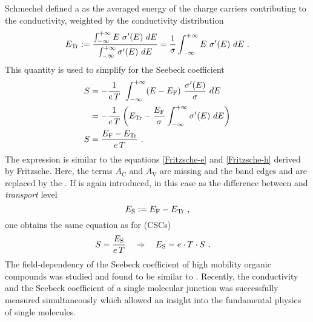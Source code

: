Schmechel defined a \EtLong \Et as the averaged energy of the charge carriers contributing to the conductivity, weighted by the conductivity distribution
\begin{equation}
\Et :=  \frac
{ \int_{-\infty} ^{+\infty} E ~ \c'(E) ~ dE }
{ \int_{-\infty} ^{+\infty} \c'(E) ~ dE } 
= \frac{1}{\c} \int_{-\infty} ^{+\infty} E ~ \c'(E) ~ dE
\label{eq:DefEt}
\PUNKT
\end{equation}
This quantity is used to simplify  for the Seebeck coefficient
\begin{align}
\S &= - \frac{1}{e\,T} ~ \int_{-\infty} ^{+\infty} (E-\Ef) ~ \frac{\c'(E)}{\c} ~ dE
\nonumber
 \\
 &= - \frac{1}{e\,T} \left(\Et - \frac{\Ef}{\c} \int_{-\infty} ^{+\infty} \c'(E)  ~ dE \right)\\
\S &=\frac{\Ef-\Et}{e\,T} \label{eq:Schmechel-S}
\PUNKT
\end{align}
The expression \lasteq is similar to the equations \eqref{Fritzsche-e} and \eqref{Fritzsche-h} derived by Fritzsche. Here, the terms $A_\text{C}$ and $A_\text{V}$ are missing and the band edges \Ec and \Ev are replaced by the \EtLong \Et. If \Es is again introduced, in this case as the difference between \EfLong and \emph{transport} level %
\begin{equation}
\Es := \Ef - \Et\label{eq:Es=Ef-Et}
\KOMMA
\end{equation}
one obtains the same equation as for \CSCs (CSCs)%
\begin{align}
\S &=\frac{\Es}{e\,T} \quad \Rightarrow \quad \Es = e \cdot T \cdot S
\label{eq:S-Es-org}
\PUNKT
\end{align}
The field-dependency of the Seebeck coefficient of high mobility organic compounds was studied and found to be similar to \CSCs\cite{Pernstich2008}.
Recently, the conductivity and the Seebeck coefficient of a single molecular junction was successfully measured simultaneously\cite{Widawsky2012} which allowed an insight into the fundamental physics of single molecules.

%

